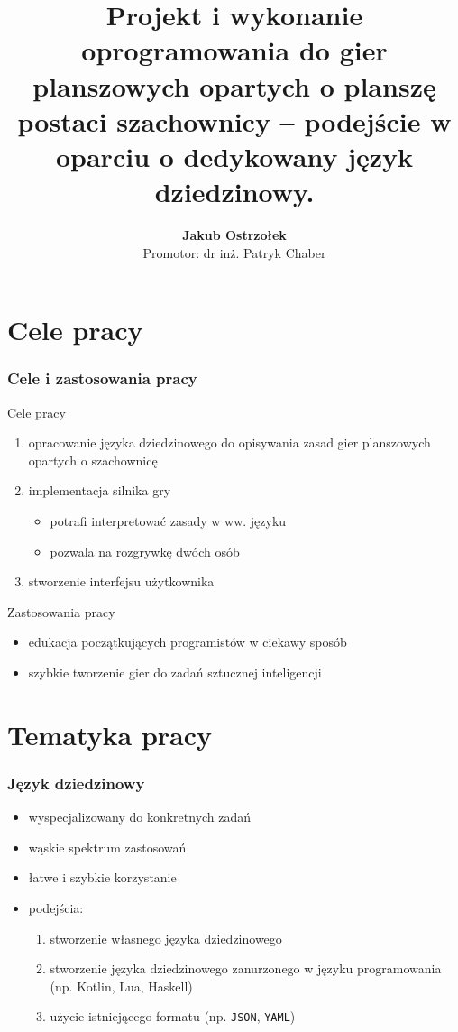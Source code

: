 \documentclass{beamer}
\title[Silnik gier opartych o szachownicę \insertframenumber/\inserttotalframenumber]{
   Projekt i wykonanie oprogramowania do gier planszowych opartych
   o planszę postaci szachownicy -- podejście w oparciu o dedykowany
   język dziedzinowy.}
\author[Jakub Ostrzołek]{\textbf{Jakub Ostrzołek} \\%
\footnotesize Promotor: dr inż. Patryk Chaber}
\institute{Instytut Automatyki i Informatyki Stosowanej\\%
Politechnika Warszawska}
\begin{document}
\frame{\titlepage}


\section{Cele pracy}

\begin{frame}
	\frametitle{Cele i zastosowania pracy}
	Cele pracy
	\begin{enumerate}
		\item opracowanie języka dziedzinowego do opisywania zasad gier planszowych opartych o szachownicę
		\item implementacja silnika gry
		      \begin{itemize}
			      \item potrafi interpretować zasady w ww. języku
			      \item pozwala na rozgrywkę dwóch osób
		      \end{itemize}
		\item stworzenie interfejsu użytkownika
	\end{enumerate}
	Zastosowania pracy
	\begin{itemize}
		\item edukacja początkujących programistów w ciekawy sposób
		\item szybkie tworzenie gier do zadań sztucznej inteligencji
	\end{itemize}
\end{frame}

\section{Tematyka pracy}

\begin{frame}
	\frametitle{Język dziedzinowy}
	\begin{itemize}
		\item wyspecjalizowany do konkretnych zadań
		\item wąskie spektrum zastosowań
		\item łatwe i szybkie korzystanie
		\item podejścia:
		\begin{enumerate}
			\item stworzenie własnego języka dziedzinowego
			\item stworzenie języka dziedzinowego zanurzonego w języku programowania (np. Kotlin, Lua, Haskell)
			\item użycie istniejącego formatu (np. {\tt JSON}, {\tt YAML})
		\end{enumerate} 
	\end{itemize}
\end{frame}
\end{document}

